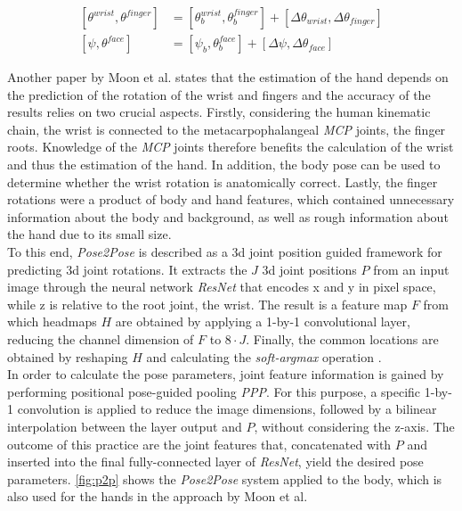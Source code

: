 \begin{equation}
\label{eq:expose_face_hand}
\begin{split}
[\theta^{wrist}, \theta^{finger}] &= [\theta^{wrist}_{b}, \theta^{finger}_{b}] + [\Delta\theta_{wrist},\Delta\theta_{finger}] \\
[\psi, \theta^{face}] &= [\psi_{b}, \theta^{face}_{b}] + [\Delta\psi,\Delta\theta_{face}]
\end{split}
\end{equation}

Another paper by Moon et al. \cite{moon} states that the estimation of the hand depends on the prediction of the rotation of the wrist and fingers and the accuracy of the results relies on two crucial aspects. Firstly, considering the human kinematic chain, the wrist is connected to the metacarpophalangeal \emph{MCP} joints, the finger roots. Knowledge of the \emph{MCP} joints therefore benefits the calculation of the wrist and thus the estimation of the hand. In addition, the body pose can be used to determine whether the wrist rotation is anatomically correct. Lastly, the finger rotations were a product of body and hand features, which contained unnecessary information about the body and background, as well as rough information about the hand due to its small size. \\
To this end, \emph{Pose2Pose} is described as a 3d joint position guided framework for predicting 3d joint rotations. It extracts the $J$ 3d joint positions $P$ from an input image through the neural network \emph{ResNet} that encodes x and y in pixel space, while z is relative to the root joint, the wrist. The result is a feature map $F$ from which headmaps $H$ are obtained by applying a 1-by-1 convolutional layer, reducing the channel dimension of $F$ to $8 \cdot J$. Finally, the common locations are obtained by reshaping $H$ and calculating the \emph{soft-argmax} operation \cite{softmax}.\\
In order to calculate the pose parameters, joint feature information is gained by performing positional pose-guided pooling \emph{PPP}. For this purpose, a specific 1-by-1 convolution is applied to reduce the image dimensions, followed by a bilinear interpolation between the layer output and $P$, without considering the z-axis. The outcome of this practice are the joint features that, concatenated with $P$ and inserted into the final fully-connected layer of \emph{ResNet}, yield the desired pose parameters. \autoref{fig:p2p} shows the \emph{Pose2Pose} system applied to the body, which is also used for the hands in the approach by Moon et al.

